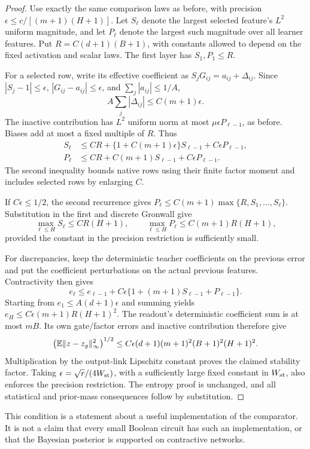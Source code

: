 \begin{proof}
Use exactly the same comparison laws as before, with precision
$\epsilon\le c/[(m+1)(H+1)]$. Let $S_\ell$ denote the largest selected feature's $L^2$ uniform magnitude, and let $P_\ell$ denote the largest such magnitude over all learner features. Put $R=C(d+1)(B+1)$, with constants allowed to depend on the fixed activation and scalar laws. The first layer has $S_1,P_1\le R$.

For a selected row, write its effective coefficient as
$S_jG_{ij}=a_{ij}+\Delta_{ij}$. Since $|S_j-1|\le\epsilon$,
$|G_{ij}-a_{ij}|\le\epsilon$, and $\sum_j|a_{ij}|\le1/A$,
\[
 A\sum_j|\Delta_{ij}|\le C(m+1)\epsilon.
\]
The inactive contribution has $L^2$ uniform norm at most $\mu\epsilon P_{\ell-1}$, as before. Biases add at most a fixed multiple of $R$. Thus
\begin{align*}
 S_\ell&\le CR+\{1+C(m+1)\epsilon\}S_{\ell-1}
                  +C\epsilon P_{\ell-1},\\
 P_\ell&\le CR+C(m+1)S_{\ell-1}+C\epsilon P_{\ell-1}.
\end{align*}
The second inequality bounds native rows using their finite factor moment and includes selected rows by enlarging $C$.

If $C\epsilon\le1/2$, the second recurrence gives
$P_\ell\le C(m+1)\max\{R,S_1,\ldots,S_\ell\}$. Substitution in the first and discrete Gronwall give
\[
 \max_{\ell\le H}S_\ell\le CR(H+1),\qquad
 \max_{\ell\le H}P_\ell\le C(m+1)R(H+1),
\]
provided the constant in the precision restriction is sufficiently small.

For discrepancies, keep the deterministic teacher coefficients on the previous error and put the coefficient perturbations on the actual previous features. Contractivity then gives
\[
 e_\ell\le e_{\ell-1}
       +C\epsilon\{1+(m+1)S_{\ell-1}+P_{\ell-1}\}.
\]
Starting from $e_1\le A(d+1)\epsilon$ and summing yields
$e_H\le C\epsilon(m+1)R(H+1)^2$.
The readout's deterministic coefficient sum is at most $mB$. Its own gate/factor errors and inactive contribution therefore give
\[
 \left(\mathbb E\|z-z_g\|_\infty^2\right)^{1/2}
 \le C\epsilon(d+1)(m+1)^2(B+1)^2(H+1)^2.
\]
Multiplication by the output-link Lipschitz constant proves the claimed stability factor. Taking $\epsilon=\sqrt r/(4W_{\rm st})$, with a sufficiently large fixed constant in $W_{\rm st}$, also enforces the precision restriction. The entropy proof is unchanged, and all statistical and prior-mass consequences follow by substitution.
\end{proof}

This condition is a statement about a useful implementation of the comparator. It is not a claim that every small Boolean circuit has such an implementation, or that the Bayesian posterior is supported on contractive networks.
